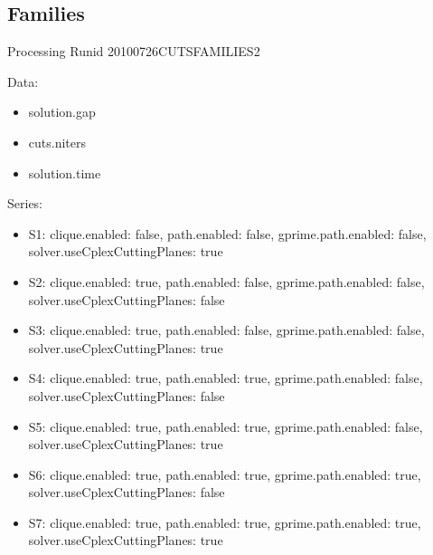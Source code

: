 \documentclass[landscape, 12pt]{report}
\begin{document}
	\clearpage
	
	\subsection{Families}
	
	Processing Runid 20100726CUTSFAMILIES2

	Data:
	\begin{itemize}
	\item solution.gap
	\item cuts.niters
	\item solution.time
	\end{itemize}
	Series:
	\begin{itemize}
	\item S1: clique.enabled: false, path.enabled: false, gprime.path.enabled: false, solver.useCplexCuttingPlanes: true
	\item S2: clique.enabled: true, path.enabled: false, gprime.path.enabled: false, solver.useCplexCuttingPlanes: false
	\item S3: clique.enabled: true, path.enabled: false, gprime.path.enabled: false, solver.useCplexCuttingPlanes: true
	\item S4: clique.enabled: true, path.enabled: true, gprime.path.enabled: false, solver.useCplexCuttingPlanes: false
	\item S5: clique.enabled: true, path.enabled: true, gprime.path.enabled: false, solver.useCplexCuttingPlanes: true
	\item S6: clique.enabled: true, path.enabled: true, gprime.path.enabled: true, solver.useCplexCuttingPlanes: false
	\item S7: clique.enabled: true, path.enabled: true, gprime.path.enabled: true, solver.useCplexCuttingPlanes: true
	\end{itemize}
\end{document}
